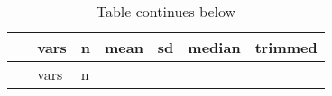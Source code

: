 \documentclass[
]{article}
\newenvironment{Shaded}{\begin{snugshade}}{\end{snugshade}}
\newcommand{\DataTypeTok}[1]{\textcolor[rgb]{0.13,0.29,0.53}{#1}}
\newcommand{\DecValTok}[1]{\textcolor[rgb]{0.00,0.00,0.81}{#1}}
\newcommand{\KeywordTok}[1]{\textcolor[rgb]{0.13,0.29,0.53}{\textbf{#1}}}
\newcommand{\NormalTok}[1]{#1}
\newcommand{\OperatorTok}[1]{\textcolor[rgb]{0.81,0.36,0.00}{\textbf{#1}}}
\newcommand{\OtherTok}[1]{\textcolor[rgb]{0.56,0.35,0.01}{#1}}
\newcommand{\StringTok}[1]{\textcolor[rgb]{0.31,0.60,0.02}{#1}}
\begin{document}
\begin{Shaded}
\end{Shaded}

\begin{longtable}[]{@{}lllllll@{}}
\caption{Table continues below}\tabularnewline
\toprule
\begin{minipage}[b]{0.19\columnwidth}\raggedright
~\strut
\end{minipage} & \begin{minipage}[b]{0.08\columnwidth}\raggedright
vars\strut
\end{minipage} & \begin{minipage}[b]{0.07\columnwidth}\raggedright
n\strut
\end{minipage} & \begin{minipage}[b]{0.12\columnwidth}\raggedright
mean\strut
\end{minipage} & \begin{minipage}[b]{0.12\columnwidth}\raggedright
sd\strut
\end{minipage} & \begin{minipage}[b]{0.11\columnwidth}\raggedright
median\strut
\end{minipage} & \begin{minipage}[b]{0.11\columnwidth}\raggedright
trimmed\strut
\end{minipage}\tabularnewline
\midrule
\endfirsthead
\toprule
\begin{minipage}[b]{0.19\columnwidth}\raggedright
~\strut
\end{minipage} & \begin{minipage}[b]{0.08\columnwidth}\raggedright
vars\strut
\end{minipage} & \begin{minipage}[b]{0.07\columnwidth}\raggedright
n\strut
\end{minipage} & \begin{minipage}[b]{0.12\columnwidth}\raggedright

\end{minipage}
\end{longtable}
\end{document}
